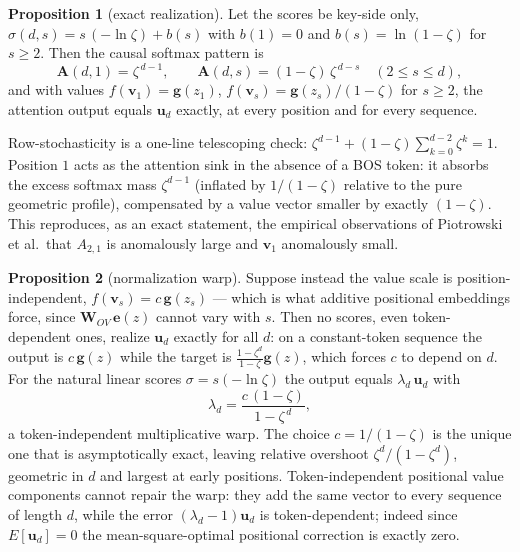 \documentclass{article}
\newcommand{\vb}{\boldsymbol{v}}
\newcommand{\eb}{\boldsymbol{e}}
\newcommand{\gb}{\boldsymbol{g}}
\newcommand{\ub}{\boldsymbol{u}}
\newcommand{\Ab}{\boldsymbol{A}}
\newcommand{\Wov}{\boldsymbol{W}_{OV}}
\theoremstyle{definition}
\newtheorem{prop}{Proposition}
\begin{document}
\begin{prop}[exact realization]\label{prop:realization}
Let the scores be key-side only, $\sigma(d,s) = s\,(-\ln\zeta) + b(s)$ with
$b(1) = 0$ and $b(s) = \ln(1-\zeta)$ for $s \ge 2$. Then the causal softmax
pattern is
\begin{equation}\label{exactpattern}
\Ab(d,1) = \zeta^{\,d-1}, \qquad
\Ab(d,s) = (1-\zeta)\,\zeta^{\,d-s} \quad (2 \le s \le d),
\end{equation}
and with values $f(\vb_1) = \gb(z_1)$, $f(\vb_s) = \gb(z_s)/(1-\zeta)$ for
$s \ge 2$, the attention output equals $\ub_d$ exactly, at every position
and for every sequence.
\end{prop}

Row-stochasticity is a one-line telescoping check:
$\zeta^{d-1} + (1-\zeta)\sum_{k=0}^{d-2}\zeta^k = 1$. Position $1$ acts as
the attention sink in the absence of a BOS token: it absorbs the excess
softmax mass $\zeta^{d-1}$ (inflated by $1/(1-\zeta)$ relative to the pure
geometric profile), compensated by a value vector smaller by exactly
$(1-\zeta)$. This reproduces, as an exact statement, the empirical
observations of Piotrowski et al.\ that $A_{2,1}$ is anomalously large and
$\vb_1$ anomalously small.

\begin{prop}[normalization warp]\label{prop:warp}
Suppose instead the value scale is position-independent,
$f(\vb_s) = c\,\gb(z_s)$ --- which is what additive positional embeddings
force, since $\Wov\,\eb(z)$ cannot vary with $s$. Then no scores, even
token-dependent ones, realize $\ub_d$ exactly for all $d$: on a
constant-token sequence the output is $c\,\gb(z)$ while the target is
$\frac{1-\zeta^d}{1-\zeta}\gb(z)$, which forces $c$ to depend on $d$. For
the natural linear scores $\sigma = s(-\ln\zeta)$ the output equals
$\lambda_d\, \ub_d$ with
\begin{equation}\label{warp}
\lambda_d = \frac{c\,(1-\zeta)}{1-\zeta^{\,d}},
\end{equation}
a token-independent multiplicative warp. The choice $c = 1/(1-\zeta)$ is the
unique one that is asymptotically exact, leaving relative overshoot
$\zeta^d/(1-\zeta^d)$, geometric in $d$ and largest at early positions.
Token-independent positional value components cannot repair the warp: they
add the same vector to every sequence of length $d$, while the error
$(\lambda_d - 1)\ub_d$ is token-dependent; indeed since $E[\ub_d] = 0$ the
mean-square-optimal positional correction is exactly zero.
\end{prop}
\end{document}
